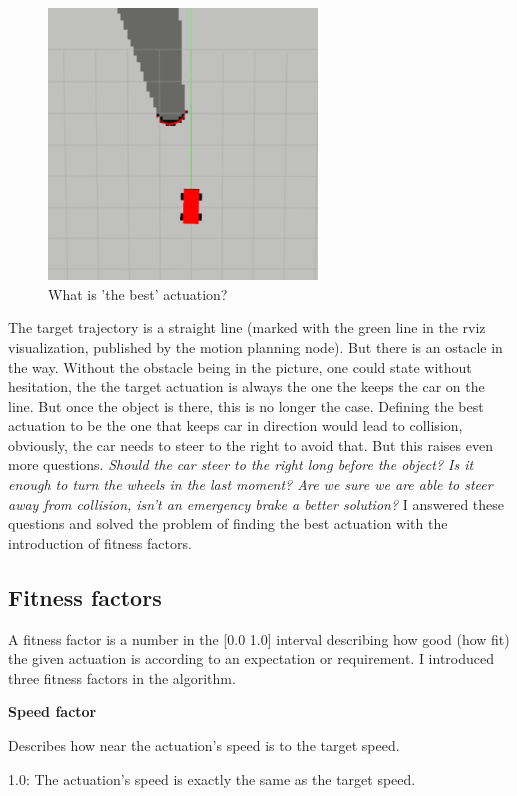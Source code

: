\begin{figure}[!ht]
    \centering
    \includegraphics[height=72mm]{figures/raw/rviz_straight_traj_static_object.png}
    \caption{What is 'the best' actuation?}
    \label{what_is_the_best_actuation}
\end{figure}

The target trajectory is a straight line (marked with the green line in the rviz visualization, published by the motion planning node). But there is an ostacle in the way. Without the obstacle being in the picture, one could state without hesitation, the the target actuation is always the one the keeps the car on the line. But once the object is there, this is no longer the case. Defining the best actuation to be the one that keeps car in direction would lead to collision, obviously, the car needs to steer to the right to avoid that. But this raises even more questions. \textit{Should the car steer to the right long before the object? Is it enough to turn the wheels in the last moment? Are we sure we are able to steer away from collision, isn't an emergency brake a better solution?} I answered these questions and solved the problem of finding the best actuation with the introduction of fitness factors.

\subsection{Fitness factors}
A fitness factor is a number in the [0.0 1.0] interval describing how good (how fit) the given actuation is according to an expectation or requirement. I introduced three fitness factors in the algorithm.

\textbf{Speed factor}

Describes how near the actuation's speed is to the target speed.

1.0: The actuation's speed is exactly the same as the target speed.

